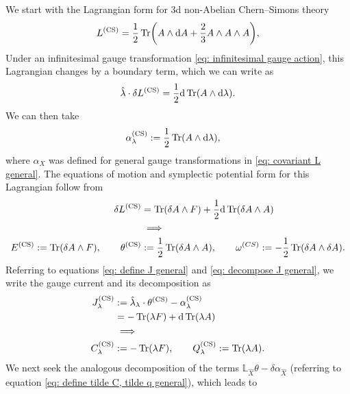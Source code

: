 \documentclass[]{jkpaper}
\theoremstyle{plain}
\theoremstyle{definition}
\newcommand{\fins}{\cdot}
\newcommand{\sd}{\mathrm {d}}
\newcommand{\fd}{\delta}
\newcommand{\fL}{\mathbb{L}}
\begin{document}
We start with the Lagrangian form for 3d non-Abelian Chern--Simons theory
\begin{equation}\label{eq: CS lagrangian}
    L^{(\text{CS})} = \frac{1}{2}\Tr(A \wedge \dd{A} + \frac{2}{3} A \wedge A \wedge A),
\end{equation}
Under an infinitesimal gauge transformation \eqref{eq: infinitesimal gauge action}, this Lagrangian changes by a boundary term, which we can write as
\begin{equation}\begin{split}
    \hat{\lambda}\fins\fd L^{(\text{CS})} &= \frac{1}{2}\sd\Tr(A\wedge \sd \lambda).\\
\end{split}\end{equation}
We can then take
\begin{equation}\begin{split}
    \alpha^{(\text{CS})}_\lambda&:=\frac{1}{2}\Tr(A\wedge\sd\lambda),
\end{split}\end{equation}
where $\alpha_{X}$ was defined for general gauge transformations in \eqref{eq: covariant L general}. 
The equations of motion and symplectic potential form for this Lagrangian follow from
\begin{equation}\begin{split}
    \delta L^{(\text{CS})} 
    &=\Tr(\fd A\wedge F) +\frac{1}{2}\sd\Tr(\fd A\wedge A)\\
    &\implies\\
    E^{(\text{CS})}:=\Tr(\fd A\wedge F), \qquad \theta^{(\text{CS})}&:=\frac{1}{2}\Tr(\fd A\wedge A), \qquad
    \omega^{(CS)}:=-\frac{1}{2}\Tr(\fd A\wedge \fd A).
\end{split}\end{equation}
Referring to equations \eqref{eq: define J general} and \eqref{eq: decompose J general}, we write the gauge current and its decomposition as 
\begin{equation}\begin{split}
    J^{(\text{CS})}_{\lambda}&:=\hat{\lambda}_{\lambda}\fins\theta^{(\text{CS})} -\alpha^{(\text{CS})}_\lambda\\
    &=-\Tr(\lambda F)+\sd\Tr(\lambda A)\\
    &\implies\\
    C^{(\text{CS})}_\lambda&:=-\Tr(\lambda F), \qquad Q^{(\text{CS})}_\lambda:=\Tr(\lambda A).
\end{split}\end{equation}
We next seek the analogous decomposition of the terms $\fL_{\hat{X}}\theta-\fd\alpha_{\hat{X}}$ (referring to equation \eqref{eq: define tilde C, tilde q general}), which leads to 
\end{document}
